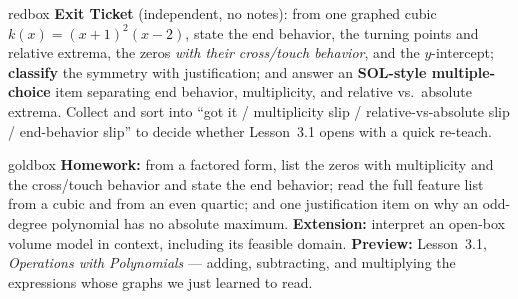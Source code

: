 \documentclass[10pt]{article}
\begin{document}
\begin{skillbox}{redbox}
\textbf{Exit Ticket} (independent, no notes): from one graphed cubic $k(x)=(x+1)^2(x-2)$, state the
end behavior, the turning points and relative extrema, the zeros \emph{with their cross/touch
behavior}, and the $y$-intercept; \textbf{classify} the symmetry with justification; and answer an
\textbf{SOL-style multiple-choice} item separating end behavior, multiplicity, and relative vs.\
absolute extrema. Collect and sort into ``got it / multiplicity slip / relative-vs-absolute slip /
end-behavior slip'' to decide whether Lesson~3.1 opens with a quick re-teach.
\end{skillbox}

\begin{skillbox}{goldbox}
\textbf{Homework:} from a factored form, list the zeros with multiplicity and the cross/touch
behavior and state the end behavior; read the full feature list from a cubic and from an even
quartic; and one justification item on why an odd-degree polynomial has no absolute maximum.
\textbf{Extension:} interpret an open-box volume model in context, including its feasible domain.
\textbf{Preview:} Lesson~3.1, \emph{Operations with Polynomials} --- adding, subtracting, and
multiplying the expressions whose graphs we just learned to read.
\end{skillbox}
\end{document}
